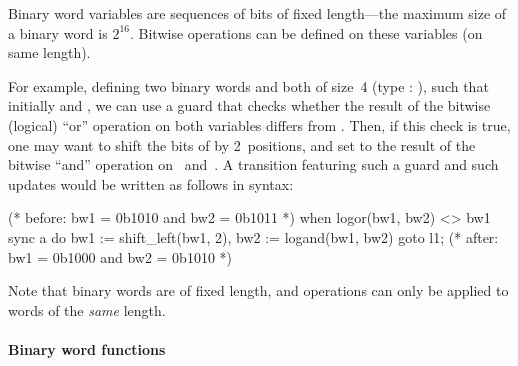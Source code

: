 Binary word variables are sequences of bits of fixed length---the maximum size of a binary word is $2^{16}$.
Bitwise operations can be defined on these variables (on same length).

For example, defining two binary words  and  both of size~4 (type : ), such that initially  and , we can use a guard  that checks whether the result of the bitwise (logical) ``or'' operation on both variables differs from .
Then, if this check is true, one may want to shift the bits of  by 2~positions, and set  to the result of the bitwise ``and'' operation on~ and~.
%
A transition featuring such a guard and such updates would be written as follows in \imitator{} syntax:

\begin{IMITATORmodel}
(* before: bw1 = 0b1010 and bw2 = 0b1011 *)
when logor(bw1, bw2) <> bw1 sync a do {bw1 := shift_left(bw1, 2), bw2 := logand(bw1, bw2)} goto l1;
(* after: bw1 = 0b1000 and bw2 = 0b1010 *)
\end{IMITATORmodel}

Note that binary words are of fixed length, and operations can only be applied to words of the \emph{same} length.




\paragraph{Binary word functions}

